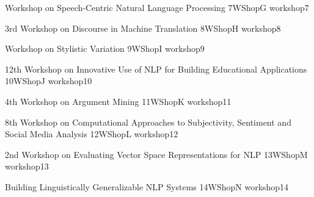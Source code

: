 \begin{wsschedule}
  {Workshop on Speech-Centric Natural Language Processing}
  {7}{WShopG}
  {workshop7}
  {\WShopLocG}
  
\end{wsschedule}
%
%  



\begin{wsschedule}
  {3rd Workshop on Discourse in Machine Translation}
  {8}{WShopH}
  {workshop8}
  {\WShopLocH}
  
\end{wsschedule}

\begin{wsschedule}
  {Workshop on Stylistic Variation}
  {9}{WShopI}
  {workshop9}
  {\WShopLocI}
  
\end{wsschedule}

\begin{wsschedule}
  {12th Workshop on Innovative Use of NLP for Building Educational Applications}
  {10}{WShopJ}
  {workshop10}
  {\WShopLocJ}
  
\end{wsschedule}

\begin{wsschedule}
  {4th Workshop on Argument Mining}
  {11}{WShopK}
  {workshop11}
  {\WShopLocK}
  
\end{wsschedule}

\begin{wsschedule}
  {8th Workshop on Computational Approaches to Subjectivity, Sentiment and Social Media Analysis}
  {12}{WShopL}
  {workshop12}
  {\WShopLocL}
  
\end{wsschedule}

\begin{wsschedule}
  {2nd Workshop on Evaluating Vector Space Representations for NLP}
  {13}{WShopM}
  {workshop13}
  {\WShopLocM}
  
\end{wsschedule}

\begin{wsschedule}
  {Building Linguistically Generalizable NLP Systems}
  {14}{WShopN}
  {workshop14}
  {\WShopLocN}
  
\end{wsschedule}


\clearpage{\thispagestyle{emptyheader}\cleardoublepage}

